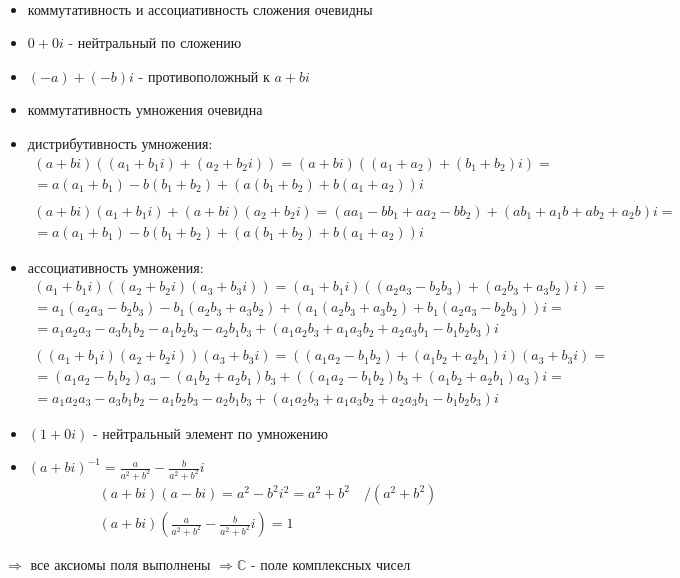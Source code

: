 \documentclass[12pt,letterpaper]{report}
\makeatletter
\theoremstyle{definition}
\renewenvironment{proof}[1][\proofname]{%
   \par\pushQED{\qed}\normalfont%
   \topsep6\p@\@plus6\p@\relax
   \trivlist\item[\hskip\labelsep\bfseries#1\@addpunct{.}]%
   \ignorespaces
}{%
   \popQED\endtrivlist\@endpefalse
}
\makeatother
\begin{document}
\begin{proof} \quad \\
  \begin{itemize}
    \item коммутативность и ассоциативность сложения очевидны
    \item $0 + 0i$ - нейтральный по сложению
    \item $(-a) + (-b)i$ - противоположный к $a + bi$
    \item коммутативность умножения очевидна
    \item дистрибутивность умножения:
    \begin{gather*}
      (a + bi)((a_1 + b_1i) + (a_2 + b_2i)) = (a + bi)((a_1 + a_2) + (b_1 + b_2)i) = \\
      = a(a_1 + b_1) - b(b_1 + b_2) + (a(b_1 + b_2) + b(a_1 + a_2))i \\ \\
      (a + bi)(a_1 + b_1i) + (a + bi)(a_2 + b_2i) = (aa_1 - bb_1 + aa_2 - bb_2) + (ab_1 + a_1b + ab_2 + a_2b)i = \\
      = a(a_1 + b_1) - b(b_1 + b_2) + (a(b_1 + b_2) + b(a_1 + a_2))i
    \end{gather*}
    \item ассоциативность умножения:
    \begin{gather*}
      (a_1 + b_1i)((a_2 + b_2i)(a_3 + b_3i)) = (a_1 + b_1i)((a_2a_3 - b_2b_3) + (a_2b_3 + a_3b_2)i) = \\
      = a_1(a_2a_3 - b_2b_3) - b_1(a_2b_3 + a_3b_2) + (a_1(a_2b_3 + a_3b_2) + b_1(a_2a_3 - b_2b_3))i = \\
      = a_1a_2a_3 - a_3b_1b_2 - a_1b_2b_3 - a_2b_1b_3 + (a_1a_2b_3 + a_1a_3b_2 + a_2a_3b_1 - b_1b_2b_3)i  \\ \\
      ((a_1 + b_1i)(a_2 + b_2i))(a_3 + b_3i) = ((a_1a_2 - b_1b_2) + (a_1b_2 + a_2b_1)i)(a_3 + b_3i) = \\
      = (a_1a_2 - b_1b_2)a_3 - (a_1b_2 + a_2b_1)b_3 + ((a_1a_2 - b_1b_2)b_3 + (a_1b_2 + a_2b_1)a_3)i = \\
      = a_1a_2a_3 - a_3b_1b_2 - a_1b_2b_3 - a_2b_1b_3 + (a_1a_2b_3 + a_1a_3b_2 + a_2a_3b_1 - b_1b_2b_3)i
    \end{gather*}
    \item $(1 + 0i)$ - нейтральный элемент по умножению 
    \item $(a + bi)^{-1} = \frac{a}{a^2 + b^2} - \frac{b}{a^2 + b^2}i$
    \begin{gather*}
      (a + bi)(a - bi) = a^2 - b^2i^2 = a^2 + b^2 \quad  /(a^2 + b^2) \\
      (a + bi)(\frac{a}{a^2 + b^2} - \frac{b}{a^2 + b^2}i) = 1
    \end{gather*}
  \end{itemize}
  $\Rightarrow$ все аксиомы поля выполнены $\Rightarrow \mathbb{C}$ - поле комплексных чисел 
\end{proof}
\end{document}

